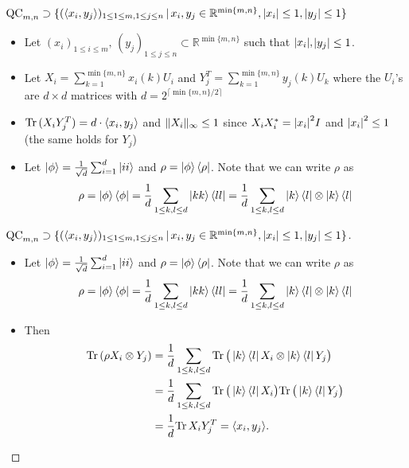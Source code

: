 \begin{frame}
	\begin{block}{$ \textup{QC}_{m,n} \supset \{ (\langle x_i,y_j \rangle)_{1 \le 1 \le m, 1 \le j \le n} \,| \, x_i,y_j \in \mathbb{R}^{ \min \{m,n \} }, \vert x_i  \vert \le 1, \vert y_j \vert \le 1  \} $}
		\begin{itemize}
			\item<1->  Let $ (x_i)_{1 \le i \le m}, \, (y_j)_{1 \le j \le n} \subset \mathbb{R}^{\min \{ m,n \}}$ such that $ {\left|{x_i}\right|},$$ {\left|{y_j}\right|} \le 1 $. 
			\item<2->  Let $ X_i = \sum_{k=1}^{\min \{m,n\}} x_i(k)U_i $ and $ Y_j^{T } = \sum_{k=1}^{\min \{m,n\}}y_j(k)U_k $ where the $ U_i $'s are $ d \times d $ matrices with $  d = 2^{\lceil \min \{m,n\}/2 \rceil} $
			\item<3-> $ \textup{Tr} \, {(X_iY_j^T)}  = d\cdot \langle x_i, y_j \rangle  $ and $  \Vert {X_i} \Vert_{\infty} \le 1 $ since $ X_iX_i^* = {\left|{x_i}\right|}^2I $ and $ {\left|{x_i}\right|}^2 \le 1  $ (the same holds for $ Y_j $)
			\item<4-> Let $ \ket{\phi} = \frac{1}{\sqrt{d}}\sum_{i= 1}^{d}\ket{ii} $ and $ \rho = \ket{\phi}\bra{\rho} $. Note that we can write $ \rho $ as
			\begin{align*}
			\rho = \ket{\phi}\bra{\phi} = \frac{1}{d}\sum_{1 \le k,l \le d}\ket{kk}\bra{ll} =  \frac{1}{d} \sum_{1 \le k,l \le d}\ket{k}\bra{l} \otimes \ket{k}\bra{l}
			\end{align*}
		\end{itemize}
	\end{block}
\end{frame}

\begin{frame}
	\begin{proof}[$ \textup{QC}_{m,n} \supset \{ (\langle x_i,y_j \rangle)_{1 \le 1 \le m, 1 \le j \le n} \,| \, x_i,y_j \in \mathbb{R}^{ \min \{m,n \} }, \vert x_i  \vert \le 1, \vert y_j \vert \le 1  \} $]
		\begin{itemize}
			\item<1->{\footnotesize Let $ \ket{\phi} = \frac{1}{\sqrt{d}}\sum_{i= 1}^{d}\ket{ii} $ and $ \rho = \ket{\phi}\bra{\rho} $. Note that we can write $ \rho $ as
			\begin{align*}
			\rho = \ket{\phi}\bra{\phi} = \frac{1}{d}\sum_{1 \le k,l \le d}\ket{kk}\bra{ll} = \frac{1}{d} \sum_{1 \le k,l \le d}\ket{k}\bra{l} \otimes \ket{k}\bra{l}
			\end{align*}}
			\item<2-> Then 
			\begin{align*}
			\textup{Tr} \, {(\rho X_i \otimes Y_j)}  &=\frac{1}{d} \sum_{1 \le k,l \le d} \textup{Tr} \, { \big (\ket{k}\bra{l}X_i \otimes \ket{k}\bra{l}Y_j \big )}    \\
			&= \frac{1}{d} \sum_{1 \le k,l \le d} \textup{Tr} \, {\big (\ket{k}\bra{l}X_i \big )}  \textup{Tr} \, {\big (\ket{k}\bra{l}Y_j \big )}  \\
			&=  \frac{1}{d} \textup{Tr} \, {X_iY_j^T}  = \langle x_i,y_j \rangle.
			\end{align*}
		\end{itemize}
	\end{proof}
\end{frame}


